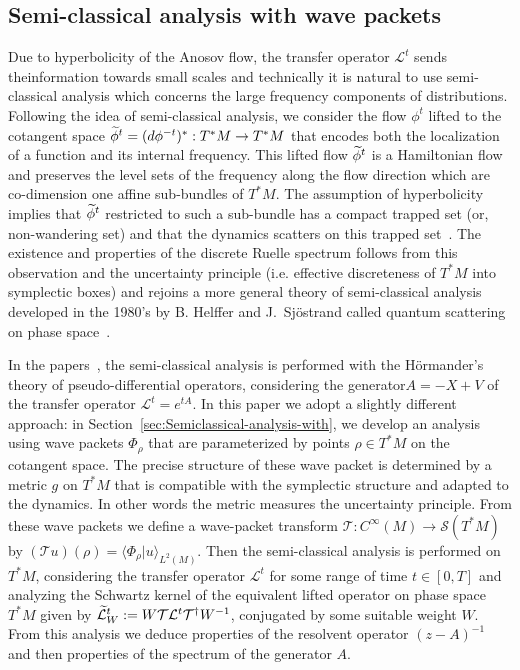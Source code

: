 \documentclass[AHL,Unicode,longabstracts,published]{cedram}
\newcommand{\clS}{\mathcal{S}}
\newcommand{\clT}{\mathcal{T}}
\newcommand{\clL}{\mathcal{L}}
\let\oldtilde\tilde
\renewcommand*{\tilde}[1]{\mathchoice{\widetilde{#1}}{\widetilde{#1}}{\oldtilde{#1}}{\oldtilde{#1}}}
\begin{document}
\subsection*{Semi-classical analysis with wave packets}

Due to hyperbolicity of the Anosov flow, the transfer operator $\clL^{t}$ sends the\linebreak information towards small scales and technically it is natural to use semi-classical analysis which concerns the large frequency components of distributions. Following the idea of semi-classical analysis, we consider the flow $\phi^{t}$ lifted to the cotangent space $\tilde{\phi}^{t}=(d\phi^{-t})^{*}:T^{*}M\rightarrow T^{*}M$ that encodes both the localization of a function and its internal frequency. This lifted flow $\tilde{\phi}^{t}$ is a Hamiltonian flow and preserves the level sets of the frequency along the flow direction which are co-dimension one affine sub-bundles of $T^{*}M$. The assumption of hyperbolicity implies that $\tilde{\phi}^{t}$ restricted to such a sub-bundle has a compact trapped set (or, non-wandering set) and that the dynamics scatters on this trapped set~\cite{fred-roy-sjostrand-07,fred_flow_09}. The existence and properties of the discrete Ruelle spectrum follows from this observation and the uncertainty principle (i.e. effective discreteness of $T^{*}M$ into symplectic boxes) and rejoins a more general theory of semi-classical analysis developed in the 1980's by B. Helffer and J.~Sj\"ostrand called quantum scattering on phase space~\cite{sjostrand_87}.

In the papers~\cite{fred-roy-sjostrand-07,fred_flow_09}, the semi-classical analysis is performed with the H\"ormander's theory of pseudo-differential operators, considering the generator\linebreak $A=-X+V$ of the transfer operator $\clL^{t}=e^{tA}$. In this paper we adopt a slightly different approach: in Section~\ref{sec:Semiclassical-analysis-with}, we develop an analysis using wave packets $\Phi_{\rho}$ that are parameterized by points $\rho\in T^{*}M$ on the cotangent space. The precise structure of these wave packet is determined by a metric $g$ on $T^{*}M$ that is compatible with the symplectic structure and adapted to the dynamics. In other words the metric measures the uncertainty principle. From these wave packets we define a wave-packet transform $\clT :C^{\infty}(M)\rightarrow\clS(T^{*}M)$ by $(\clT u)(\rho)=\langle\Phi_{\rho}|u\rangle_{L^{2}(M)}$. Then the semi-classical analysis is performed on $T^{*}M$, considering the transfer operator $\clL^{t}$ for some range of time $t\in[0,T]$ and analyzing the Schwartz kernel of the equivalent lifted operator on phase space $T^{*}M$ given by $\tilde{\clL}_{W}^{t}:=W\clT\clL^{t}\clT^{\dagger}W^{-1}$, conjugated by some suitable weight $W$. From this analysis we deduce properties of the resolvent operator $(z-A)^{-1}$ and then properties of the spectrum of the generator $A$.
\end{document}
